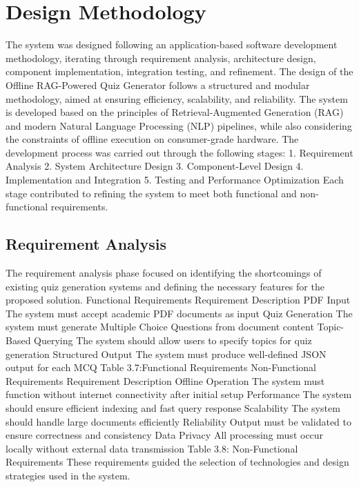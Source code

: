 \documentclass[12pt,a4paper]{report}
\begin{document}
\section{Design Methodology}
The system was designed following an application-based software development methodology, iterating through requirement analysis, architecture design, component implementation, integration testing, and refinement.
The design of the Offline RAG-Powered Quiz Generator follows a structured and modular methodology, aimed at ensuring efficiency, scalability, and reliability. The system is developed based on the principles of Retrieval-Augmented Generation (RAG) and modern Natural Language Processing (NLP) pipelines, while also considering the constraints of offline execution on consumer-grade hardware. The development process was carried out through the following stages: 1. Requirement Analysis 2. System Architecture Design 3. Component-Level Design 4. Implementation and Integration 5. Testing and Performance Optimization Each stage contributed to refining the system to meet both functional and non-functional requirements.
\subsection{Requirement Analysis}
The requirement analysis phase focused on identifying the shortcomings of existing quiz generation systems and defining the necessary features for the proposed solution.
Functional Requirements
Requirement
Description
PDF Input
The system must accept academic PDF documents as input
Quiz Generation
The system must generate Multiple Choice Questions from document content
Topic-Based Querying
The system should allow users to specify topics for quiz generation
Structured Output
The system must produce well-defined JSON output for each MCQ
Table 3.7:Functional Requirements
Non-Functional Requirements
Requirement
Description
Offline Operation
The system must function without internet connectivity after initial setup
Performance
The system should ensure efficient indexing and fast query response
Scalability
The system should handle large documents efficiently
Reliability
Output must be validated to ensure correctness and consistency
Data Privacy
All processing must occur locally without external data transmission
Table 3.8: Non-Functional Requirements
These requirements guided the selection of technologies and design strategies used in the system.
\end{document}
